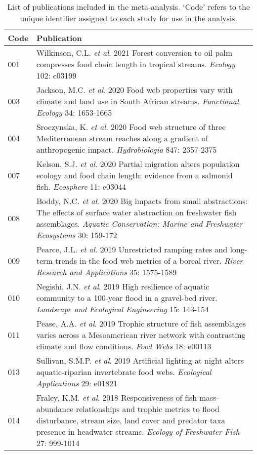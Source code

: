 \begingroup\small
\begin{longtable}{p{}p{}}
\caption{List of publications included in the meta-analysis.
             `Code' refers to the unique identifier assigned to each study for use in the analysis.
             \label{tab:meta-list}} \\ 
  \hline
Code & Publication \\ 
  \hline
001 & Wilkinson, C.L. \textit{et al}. 2021 Forest conversion to oil palm compresses food chain length in tropical streams. \textit{Ecology} 102: e03199 \\ 
  003 & Jackson, M.C. \textit{et al}. 2020 Food web properties vary with climate and land use in South African streams. \textit{Functional Ecology} 34: 1653-1665 \\ 
  004 & Sroczynska, K. \textit{et al}. 2020 Food web structure of three Mediterranean stream reaches along a gradient of anthropogenic impact. \textit{Hydrobiologia} 847: 2357-2375 \\ 
  007 & Kelson, S.J. \textit{et al}. 2020 Partial migration alters population ecology and food chain length: evidence from a salmonid fish. \textit{Ecosphere} 11: e03044 \\ 
  008 & Boddy, N.C. \textit{et al}. 2020 Big impacts from small abstractions: The effects of surface water abstraction on freshwater fish assemblages. \textit{Aquatic Conservation: Marine and Freshwater Ecosystems} 30: 159-172 \\ 
  009 & Pearce, J.L. \textit{et al}. 2019 Unrestricted ramping rates and long-term trends in the food web metrics of a boreal river. \textit{River Research and Applications} 35: 1575-1589 \\ 
  010 & Negishi, J.N. \textit{et al}. 2019 High resilience of aquatic community to a 100-year flood in a gravel-bed river. \textit{Landscape and Ecological Engineering} 15: 143-154 \\ 
  011 & Pease, A.A. \textit{et al}. 2019 Trophic structure of fish assemblages varies across a Mesoamerican river network with contrasting climate and flow conditions. \textit{Food Webs} 18: e00113 \\ 
  013 & Sullivan, S.M.P. \textit{et al}. 2019 Artificial lighting at night alters aquatic-riparian invertebrate food webs. \textit{Ecological Applications} 29: e01821 \\ 
  014 & Fraley, K.M. \textit{et al}. 2018 Responsiveness of fish mass-abundance relationships and trophic metrics to flood disturbance, stream size, land cover and predator taxa presence in headwater streams. \textit{Ecology of Freshwater Fish} 27: 999-1014 \\ 

\end{longtable}
